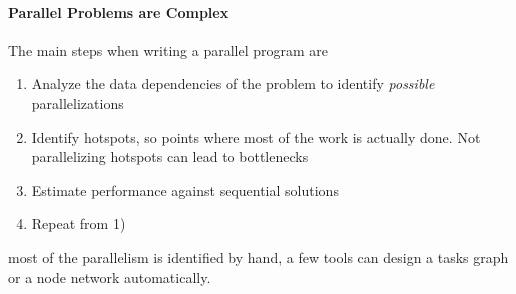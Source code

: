 \documentclass{article}
\begin{document}
			\paragraph{Parallel Problems are Complex}
				The main steps when writing a parallel program are 
				\begin{enumerate}
					\item Analyze the data dependencies of the problem to identify \textit{possible} parallelizations
					\item Identify hotspots, so points where most of the work is actually done. Not parallelizing hotspots can lead to bottlenecks
					\item Estimate performance against sequential solutions
					\item Repeat from 1)
				\end{enumerate}
				most of the parallelism is identified by hand, a few tools can design a tasks graph or a node network automatically.
\end{document}
